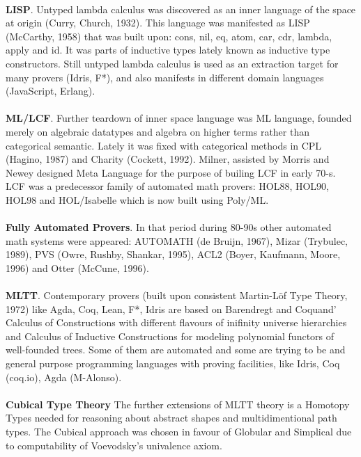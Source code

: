 \documentclass[11pt,oneside]{article}
\begin{document}
\paragraph{}
{\bf LISP}. Untyped lambda calculus was discovered as an inner language of the space
at origin (Curry, Church, 1932). This language was manifested as LISP (McCarthy, 1958)
that was built upon: cons, nil, eq, atom, car, cdr, lambda, apply and id.
It was parts of inductive types lately known as inductive type constructors.
Still untyped lambda calculus is used as an extraction target for many
provers (Idris, F*), and also manifests in different domain languages (JavaScript, Erlang).

\paragraph{}
{\bf ML/LCF}. Further teardown of inner space language was ML language, founded merely on algebraic
datatypes and algebra on higher terms rather than categorical semantic. Lately it
was fixed with categorical methods in CPL (Hagino, 1987) and Charity (Cockett, 1992).
Milner, assisted by Morris and Newey designed Meta Language for the purpose of builing LCF
in early 70-s. LCF was a predecessor family of automated math provers: HOL88,
HOL90, HOL98 and HOL/Isabelle which is now built using Poly/ML.

\paragraph{}
{\bf Fully Automated Provers}. In that period during 80-90s other automated math systems were appeared:
AUTOMATH (de Bruijn, 1967), Mizar (Trybulec, 1989), PVS (Owre, Rushby, Shankar, 1995),
ACL2 (Boyer, Kaufmann, Moore, 1996) and Otter (McCune, 1996).

\paragraph{}
{\bf MLTT}. Contemporary provers (built upon consistent Martin-Löf Type Theory, 1972)
like Agda, Coq, Lean, F*, Idris are based on Barendregt
and Coquand' Calculus of Constructions with different flavours of inifinity universe hierarchies
and Calculus of Inductive Constructions for modeling polynomial functors of well-founded trees.
Some of them are automated and some are trying to be and general purpose
programming languages with proving facilities, like Idris, Coq (coq.io), Agda (M-Alonso).

\paragraph{}
{\bf Cubical Type Theory}
The further extensions of MLTT theory is a Homotopy Types needed
for reasoning about abstract shapes and multidimentional path types.
The Cubical approach was chosen in favour of Globular and Simplical
due to computability of Voevodsky's univalence axiom.
\end{document}
